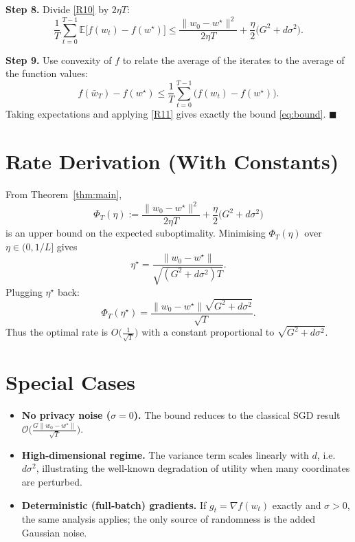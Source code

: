 \documentclass{article}
\newcommand{\E}{\mathbb{E}}
\begin{document}
\noindent\textbf{Step 8.}  Divide \eqref{R10} by $2\eta T$:
\begin{equation}
\frac1T\sum_{t=0}^{T-1}\E\!\big[f(w_t)-f(w^\star)\big]
\le \frac{\|w_0-w^\star\|^{2}}{2\eta T}
+\frac{\eta}{2}\big(G^{2}+d\sigma^{2}\big). \tag{R11}
\end{equation}

\noindent\textbf{Step 9.}  Use convexity of $f$ to relate the average of the iterates to the average of the function values:
\[
f(\bar w_T)-f(w^\star)\le\frac1T\sum_{t=0}^{T-1}\big(f(w_t)-f(w^\star)\big).
\]
Taking expectations and applying \eqref{R11} gives exactly the bound \eqref{eq:bound}.
\hfill $\blacksquare$

\section*{Rate Derivation (With Constants)}
From Theorem~\ref{thm:main},
\[
\Phi_T(\eta):=\frac{\|w_0-w^\star\|^2}{2\eta T}
   +\frac{\eta}{2}\big(G^2+d\sigma^2\big)
\]
is an upper bound on the expected suboptimality.  Minimising $\Phi_T(\eta)$ over $\eta\in(0,1/L]$ gives
\[
\eta^\star=\frac{\|w_0-w^\star\|}{\sqrt{(G^2+d\sigma^2)T}} .
\]
Plugging $\eta^\star$ back:
\[
\Phi_T(\eta^\star)=\frac{\|w_0-w^\star\|\sqrt{G^2+d\sigma^2}}{\sqrt{T}} .
\]
Thus the optimal rate is $O\big(\frac{1}{\sqrt{T}}\big)$ with a constant proportional to $\sqrt{G^2+d\sigma^2}$.

\section*{Special Cases}
\begin{itemize}
\item \textbf{No privacy noise ($\sigma=0$).}  The bound reduces to the classical SGD result $\mathcal O\big(\frac{G\|w_0-w^\star\|}{\sqrt{T}}\big)$.
\item \textbf{High‑dimensional regime.}  The variance term scales linearly with $d$, i.e. $d\sigma^2$, illustrating the well‑known degradation of utility when many coordinates are perturbed.
\item \textbf{Deterministic (full‑batch) gradients.}  If $g_t=\nabla f(w_t)$ exactly and $\sigma>0$, the same analysis applies; the only source of randomness is the added Gaussian noise.
\end{itemize}

\end{document}
